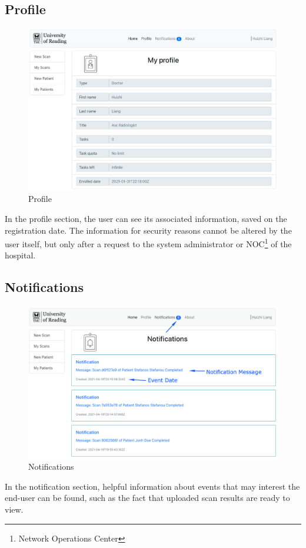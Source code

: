 		\subsection{Profile}
			\label{profile-screen}
			\begin{figure}[H]
				\iftrue
				\centering
				\caption{Profile}
				\includegraphics[scale=0.3]{figures/profile}
				\fi
			\end{figure}
			In the profile section, the user can see its associated information, saved on the registration date. 
			The information for security reasons cannot be altered by the user itself, but only after a request to 
			the system administrator or NOC\footnote{Network Operations Center} of the hospital.
		\subsection{Notifications}
			\label{notification-screen}
			\begin{figure}[H]
				\iftrue
				\centering
				\caption{Notifications}
				\includegraphics[scale=0.3]{figures/notifications}
				\fi
			\end{figure}
			In the notification section, helpful information about events that may interest the end-user can be found, 
			such as the fact that uploaded scan results are ready to view. 
